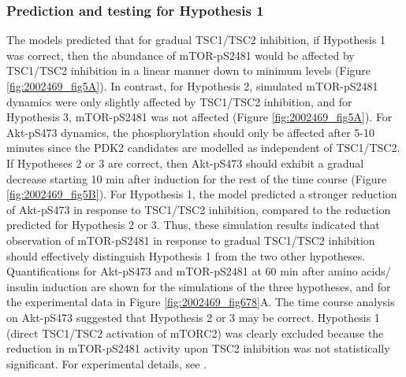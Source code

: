 \subsubsection{Prediction and testing for Hypothesis 1}
\label{paper1-subsubsec:Prediction and testing for Hypothesis 1}
The models predicted that for gradual TSC1/TSC2 inhibition, if Hypothesis 1 was correct, then the abundance of mTOR-pS2481 would be affected by TSC1/TSC2 inhibition in a linear manner down to minimum levels (Figure \ref{fig:2002469_fig5A}). In contrast, for Hypothesis 2, simulated mTOR-pS2481 dynamics were only slightly affected by TSC1/TSC2 inhibition, and for Hypothesis 3, mTOR-pS2481 was not affected (Figure \ref{fig:2002469_fig5A}). For Akt-pS473 dynamics, the phosphorylation should only be affected after 5-10 minutes since the PDK2 candidates are modelled as independent of TSC1/TSC2. If Hypotheses 2 or 3 are correct, then Akt-pS473 should exhibit a gradual decrease starting 10 min after induction for the rest of the time course (Figure \ref{fig:2002469_fig5B}). For Hypothesis 1, the model predicted a stronger reduction of Akt-pS473 in response to TSC1/TSC2 inhibition, compared to the reduction predicted for Hypothesis 2 or 3. Thus, these simulation results indicated that observation of mTOR-pS2481 in response to gradual TSC1/TSC2 inhibition should effectively distinguish Hypothesis 1 from the two other hypotheses.\\
Quantifications for Akt-pS473 and mTOR-pS2481 at 60 min after amino acids/ insulin induction are shown for the simulations of the three hypotheses, and for the experimental data in Figure \ref{fig:2002469_fig678}A. The time course analysis on Akt-pS473 suggested that Hypothesis 2 or 3 may be correct. Hypothesis 1 (direct TSC1/TSC2 activation of mTORC2) was clearly excluded because the reduction in mTOR-pS2481 activity upon TSC2 inhibition was not statistically significant. For experimental details, see \citep[Fig. 6]{DallePezze2012a}.
